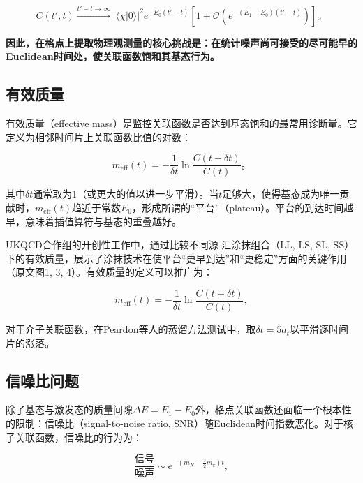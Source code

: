\documentclass[12pt,a4paper]{ctexart}
\theoremstyle{definition}
\begin{document}
\begin{equation}
C(t', t) \xrightarrow{t'-t \to \infty} |\langle \chi|0\rangle|^2 e^{-E_0(t'-t)} \left[1 + \mathcal{O}(e^{-(E_1-E_0)(t'-t)})\right]。
\label{eq:ground_state_dominance}
\end{equation}

\textbf{因此，在格点上提取物理观测量的核心挑战是：在统计噪声尚可接受的尽可能早的Euclidean时间处，使关联函数饱和其基态行为。}

\subsection{有效质量}

有效质量（effective mass）是监控关联函数是否达到基态饱和的最常用诊断量\cite{UKQCD1993}。它定义为相邻时间片上关联函数比值的对数：

\begin{equation}
\boxed{m_{\text{eff}}(t) = -\frac{1}{\delta t} \ln\frac{C(t + \delta t)}{C(t)}}。
\label{eq:effective_mass}
\end{equation}

其中$\delta t$通常取为1（或更大的值以进一步平滑）。当$t$足够大，使得基态成为唯一贡献时，$m_{\text{eff}}(t)$趋近于常数$E_0$，形成所谓的``平台''（plateau）。平台的到达时间越早，意味着插值算符与基态的重叠越好。

UKQCD合作组的开创性工作中\cite{UKQCD1993}，通过比较不同源-汇涂抹组合（LL, LS, SL, SS）下的有效质量，展示了涂抹技术在使平台``更早到达''和``更稳定''方面的关键作用（原文图1, 3, 4）。有效质量的定义可以推广为：

\begin{equation}
m_{\text{eff}}(t) = -\frac{1}{\delta t} \ln\frac{C(t + \delta t)}{C(t)},
\label{eq:eff_mass_delta}
\end{equation}

对于介子关联函数，在Peardon等人的蒸馏方法测试中\cite{Peardon2009}，取$\delta t = 5 a_t$以平滑逐时间片的涨落。

\subsection{信噪比问题}

除了基态与激发态的质量间隙$\Delta E = E_1 - E_0$外，格点关联函数还面临一个根本性的限制：信噪比（signal-to-noise ratio, SNR）随Euclidean时间指数恶化。对于核子关联函数，信噪比的行为为：

\begin{equation}
\frac{\text{信号}}{\text{噪声}} \sim e^{-(m_N - \frac{3}{2}m_\pi)t},
\label{eq:SNR_nucleon}
\end{equation}
\end{document}
